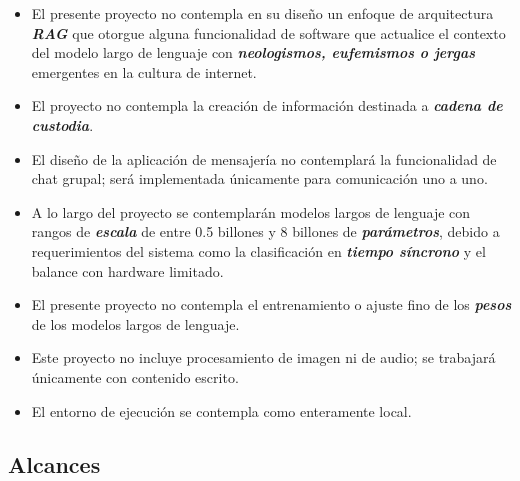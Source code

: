 \begin{itemize}
    \item El presente proyecto no contempla en su diseño un enfoque de arquitectura \textbf{\textit{RAG}} que otorgue alguna funcionalidad de software que actualice el contexto del modelo largo de lenguaje con \textbf{\textit{neologismos, eufemismos o jergas}} emergentes en la cultura de internet.

    \item El proyecto no contempla la creación de información destinada a \textbf{\textit{cadena de custodia}}.

    \item El diseño de la aplicación de mensajería no contemplará la funcionalidad de chat grupal; será implementada únicamente para comunicación uno a uno.

    \item A lo largo del proyecto se contemplarán modelos largos de lenguaje con rangos de \textbf{\textit{escala}} de entre 0.5 billones y 8 billones de \textbf{\textit{parámetros}}, debido a requerimientos del sistema como la clasificación en \textbf{\textit{tiempo síncrono}} y el balance con hardware limitado.

    \item El presente proyecto no contempla el entrenamiento o ajuste fino de los \textbf{\textit{pesos}} de los modelos largos de lenguaje.

    \item Este proyecto no incluye procesamiento de imagen ni de audio; se trabajará únicamente con contenido escrito.

    \item El entorno de ejecución se contempla como enteramente local.
\end{itemize}


\subsection{Alcances}

